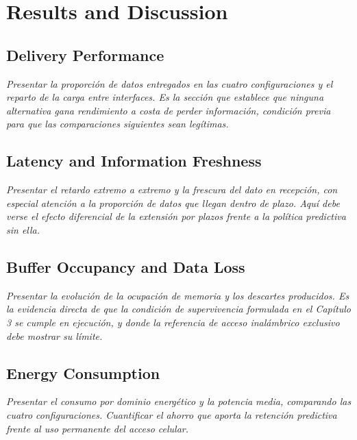 \chapter{Results and Discussion}


\section{Delivery Performance}
\emph{Presentar la proporción de datos entregados en las cuatro configuraciones y
el reparto de la carga entre interfaces. Es la sección que establece que ninguna
alternativa gana rendimiento a costa de perder información, condición previa para
que las comparaciones siguientes sean legítimas.}

\section{Latency and Information Freshness}
\emph{Presentar el retardo extremo a extremo y la frescura del dato en recepción,
con especial atención a la proporción de datos que llegan dentro de plazo. Aquí
debe verse el efecto diferencial de la extensión por plazos frente a la política
predictiva sin ella.}

\section{Buffer Occupancy and Data Loss}
\emph{Presentar la evolución de la ocupación de memoria y los descartes
producidos. Es la evidencia directa de que la condición de supervivencia
formulada en el Capítulo 3 se cumple en ejecución, y donde la referencia de
acceso inalámbrico exclusivo debe mostrar su límite.}

\section{Energy Consumption}
\emph{Presentar el consumo por dominio energético y la potencia media,
comparando las cuatro configuraciones. Cuantificar el ahorro que aporta la
retención predictiva frente al uso permanente del acceso celular.}

